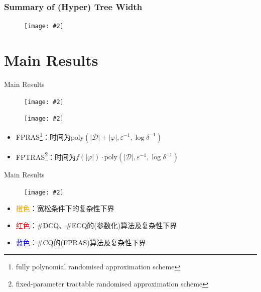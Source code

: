 \documentclass{beamer}
\newcommand{\pic}[2][100]{
	\begin{figure}
		\centering
		\texttt{[image: \#2]}
	\end{figure}
}
\newcommand{\picframe}[3][100]{
	\begin{frame}
		\frametitle{#2}
		\pic[#1]{#3}
	\end{frame}
}
\begin{document}
	\picframe{Summary of (Hyper) Tree Width}{pics/tw}
	\section{Main Results}
	\begin{frame}{Main Results}
		\pic{pics/mainthm}
		\pic{pics/proofapproach}
		\begin{itemize}
			\item FPRAS\footnote{fully polynomial randomised approximation scheme}：时间为$\mathrm{poly}(|\mathcal{D}|+|\varphi|,\varepsilon^{-1},\log\delta^{-1})$
			\item FPTRAS\footnote{fixed-parameter tractable randomised approximation scheme}：时间为$f(|\varphi|)\cdot\mathrm{poly}(|\mathcal{D}|,\varepsilon^{-1},\log\delta^{-1})$
		\end{itemize}
	\end{frame}
	\begin{frame}{Main Results}
		\pic{pics/results}
		\vspace{-1ex}
		\begin{itemize}
			\item \textcolor{orange}{橙色}：宽松条件下的复杂性下界
			\item \textcolor{red}{红色}：\#DCQ、\#ECQ的{\tiny(参数化)}算法及复杂性下界
			\item \textcolor{blue}{蓝色}：\#CQ的{\tiny(FPRAS)}算法及复杂性下界 
		\end{itemize}
	\end{frame}
\end{document}

